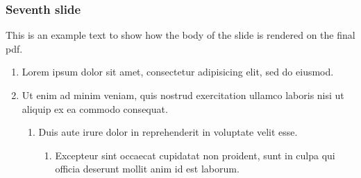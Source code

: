 \documentclass[./main.tex]{subfiles}
\begin{document}
\begin{frame}[label=slide07]
        \frametitle{Seventh slide}

        This is an example text to show how the body of the slide is rendered on the final pdf.
        \begin{enumerate}
                \item Lorem ipsum dolor sit amet, consectetur adipisicing elit, sed do eiusmod.
                \item  Ut enim ad minim veniam, quis nostrud exercitation ullamco laboris nisi ut aliquip ex ea commodo consequat. 
                \begin{enumerate}
                        \item Duis aute irure dolor in reprehenderit in voluptate velit esse.
                        \begin{enumerate}
                                \item Excepteur sint occaecat cupidatat non proident, sunt in culpa qui officia deserunt mollit anim id est laborum.
                        \end{enumerate}
                \end{enumerate}
        \end{enumerate}
        \hyperlink{slide01}{}
        \hyperlink{slide03}{}
\end{frame}
\end{document}
